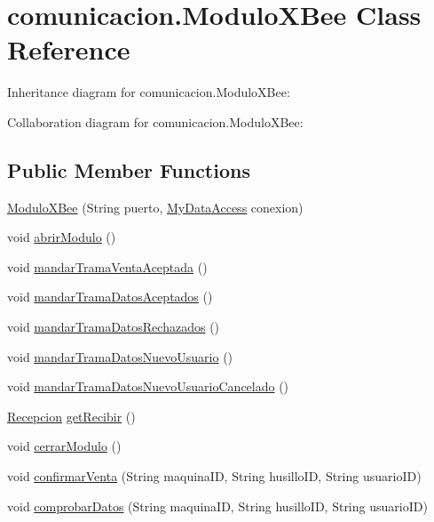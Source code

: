\hypertarget{classcomunicacion_1_1_modulo_x_bee}{}\section{comunicacion.\+Modulo\+X\+Bee Class Reference}
\label{classcomunicacion_1_1_modulo_x_bee}


Inheritance diagram for comunicacion.\+Modulo\+X\+Bee\+:


Collaboration diagram for comunicacion.\+Modulo\+X\+Bee\+:
\subsection*{Public Member Functions}
\begin{DoxyCompactItemize}
\item 
\mbox{\hyperlink{classcomunicacion_1_1_modulo_x_bee_aaea76284c0f4a44f4223888c9a8b44ea}{Modulo\+X\+Bee}} (String puerto, \mbox{\hyperlink{classconexion_s_q_l_1_1_my_data_access}{My\+Data\+Access}} conexion)
\item 
void \mbox{\hyperlink{classcomunicacion_1_1_modulo_x_bee_a2d5ad79e8571f3a2daaf66e3b5df4351}{abrir\+Modulo}} ()
\item 
void \mbox{\hyperlink{classcomunicacion_1_1_modulo_x_bee_a71bbc67392676c9e0bd57813a87d06c0}{mandar\+Trama\+Venta\+Aceptada}} ()
\item 
void \mbox{\hyperlink{classcomunicacion_1_1_modulo_x_bee_a60d0556ad61da3b8f66d192779c70bd7}{mandar\+Trama\+Datos\+Aceptados}} ()
\item 
void \mbox{\hyperlink{classcomunicacion_1_1_modulo_x_bee_ac996e20c06c0e1c33f868e33d13f083b}{mandar\+Trama\+Datos\+Rechazados}} ()
\item 
void \mbox{\hyperlink{classcomunicacion_1_1_modulo_x_bee_aecb573d973ba1e5e24a2c2cc5d1541f6}{mandar\+Trama\+Datos\+Nuevo\+Usuario}} ()
\item 
void \mbox{\hyperlink{classcomunicacion_1_1_modulo_x_bee_a965cdd2756d507c8c80eade0bf34d06e}{mandar\+Trama\+Datos\+Nuevo\+Usuario\+Cancelado}} ()
\item 
\mbox{\hyperlink{classcomunicacion_1_1_recepcion}{Recepcion}} \mbox{\hyperlink{classcomunicacion_1_1_modulo_x_bee_aa5c08aaaafb7b4dcb11fecb4fb47812f}{get\+Recibir}} ()
\item 
void \mbox{\hyperlink{classcomunicacion_1_1_modulo_x_bee_a4691476e52e74492bd9d9bc6919f0c4a}{cerrar\+Modulo}} ()
\item 
void \mbox{\hyperlink{classcomunicacion_1_1_modulo_x_bee_a34debd695cc102e385156983a52a658c}{confirmar\+Venta}} (String maquina\+ID, String husillo\+ID, String usuario\+ID)
\item 
void \mbox{\hyperlink{classcomunicacion_1_1_modulo_x_bee_aa9794310e90df8198dbcfc8aacaa1405}{comprobar\+Datos}} (String maquina\+ID, String husillo\+ID, String usuario\+ID)
\end{DoxyCompactItemize}


